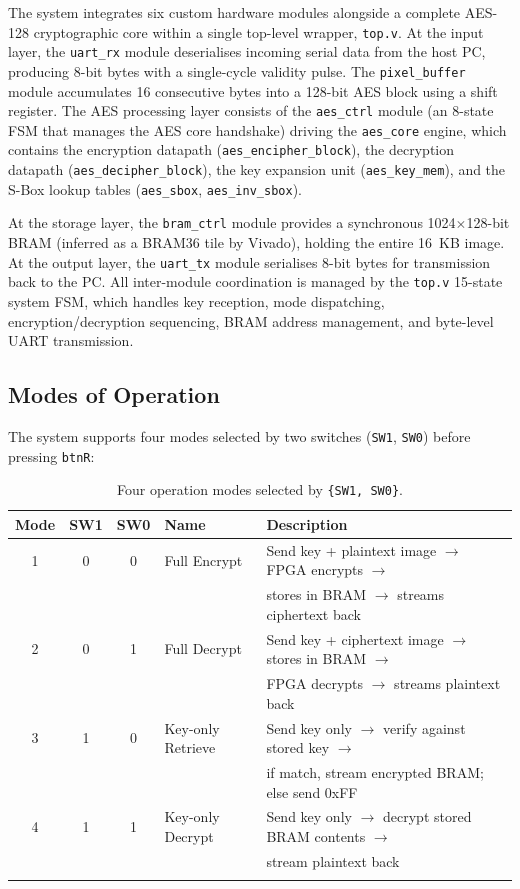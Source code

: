 \documentclass[12pt,a4paper]{article}
\begin{document}
The system integrates six custom hardware modules alongside a complete AES-128 cryptographic core within a single top-level wrapper, \texttt{top.v}. At the input layer, the \texttt{uart\_rx} module deserialises incoming serial data from the host PC, producing 8-bit bytes with a single-cycle validity pulse. The \texttt{pixel\_buffer} module accumulates 16 consecutive bytes into a 128-bit AES block using a shift register. The AES processing layer consists of the \texttt{aes\_ctrl} module (an 8-state FSM that manages the AES core handshake) driving the \texttt{aes\_core} engine, which contains the encryption datapath (\texttt{aes\_encipher\_block}), the decryption datapath (\texttt{aes\_decipher\_block}), the key expansion unit (\texttt{aes\_key\_mem}), and the S-Box lookup tables (\texttt{aes\_sbox}, \texttt{aes\_inv\_sbox}).

At the storage layer, the \texttt{bram\_ctrl} module provides a synchronous 1024$\times$128-bit BRAM (inferred as a BRAM36 tile by Vivado), holding the entire 16~KB image. At the output layer, the \texttt{uart\_tx} module serialises 8-bit bytes for transmission back to the PC. All inter-module coordination is managed by the \texttt{top.v} 15-state system FSM, which handles key reception, mode dispatching, encryption/decryption sequencing, BRAM address management, and byte-level UART transmission.

\subsection{Modes of Operation}

The system supports four modes selected by two switches (\texttt{SW1}, \texttt{SW0}) before pressing \texttt{btnR}:

\begin{longtable}{@{}cccll@{}}
\toprule
\textbf{Mode} & \textbf{SW1} & \textbf{SW0} & \textbf{Name} & \textbf{Description} \\
\midrule
\endhead
1 & 0 & 0 & Full Encrypt & Send key + plaintext image $\to$ FPGA encrypts $\to$ \\
  &   &   &              & stores in BRAM $\to$ streams ciphertext back \\[4pt]
2 & 0 & 1 & Full Decrypt & Send key + ciphertext image $\to$ stores in BRAM $\to$ \\
  &   &   &              & FPGA decrypts $\to$ streams plaintext back \\[4pt]
3 & 1 & 0 & Key-only Retrieve & Send key only $\to$ verify against stored key $\to$ \\
  &   &   &                   & if match, stream encrypted BRAM; else send 0xFF \\[4pt]
4 & 1 & 1 & Key-only Decrypt & Send key only $\to$ decrypt stored BRAM contents $\to$ \\
  &   &   &                  & stream plaintext back \\
\bottomrule
\caption{Four operation modes selected by \texttt{\{SW1, SW0\}}.}
\label{tab:modes}
\end{longtable}
\end{document}
